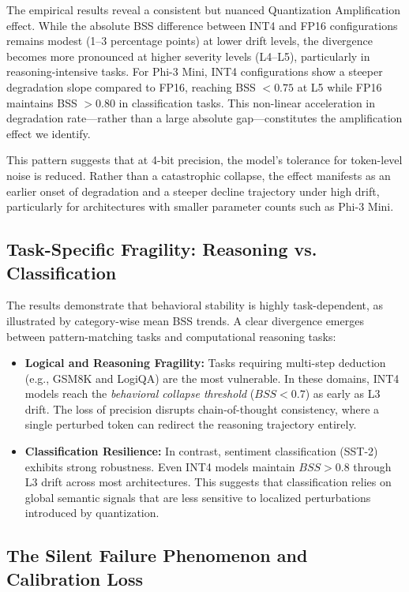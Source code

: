 \documentclass[conference]{IEEEtran}
\begin{document}
The empirical results reveal a consistent but nuanced Quantization Amplification effect. While the absolute BSS difference between INT4 and FP16 configurations remains modest (1--3 percentage points) at lower drift levels, the divergence becomes more pronounced at higher severity levels (L4--L5), particularly in reasoning-intensive tasks. For Phi-3 Mini, INT4 configurations show a steeper degradation slope compared to FP16, reaching BSS $< 0.75$ at L5 while FP16 maintains BSS $> 0.80$ in classification tasks. This non-linear acceleration in degradation rate---rather than a large absolute gap---constitutes the amplification effect we identify.

This pattern suggests that at 4-bit precision, the model's tolerance for token-level noise is reduced. Rather than a catastrophic collapse, the effect manifests as an earlier onset of degradation and a steeper decline trajectory under high drift, particularly for architectures with smaller parameter counts such as Phi-3 Mini.

\subsection{Task-Specific Fragility: Reasoning vs. Classification}

The results demonstrate that behavioral stability is highly task-dependent, as illustrated by category-wise mean BSS trends. A clear divergence emerges between pattern-matching tasks and computational reasoning tasks:

\begin{itemize}
\item \textbf{Logical and Reasoning Fragility:} Tasks requiring multi-step deduction (e.g., GSM8K and LogiQA) are the most vulnerable. In these domains, INT4 models reach the \textit{behavioral collapse threshold} ($BSS < 0.7$) as early as L3 drift. The loss of precision disrupts chain-of-thought consistency, where a single perturbed token can redirect the reasoning trajectory entirely.
\item \textbf{Classification Resilience:} In contrast, sentiment classification (SST-2) exhibits strong robustness. Even INT4 models maintain $BSS > 0.8$ through L3 drift across most architectures. This suggests that classification relies on global semantic signals that are less sensitive to localized perturbations introduced by quantization.
\end{itemize}

\subsection{The Silent Failure Phenomenon and Calibration Loss}
\end{document}
